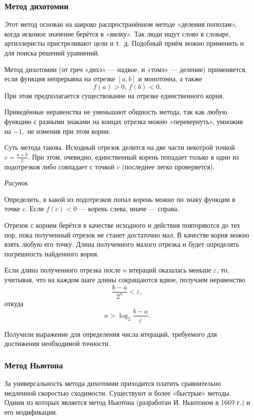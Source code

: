 \subsubsection{Метод дихотомии}

Этот метод основан на широко распространённом методе «деления пополам»,
когда искомое значение берётся в »вилку». Так люди ищут слово в словаре,
артиллеристы пристреливают цели и т.~д. Подобный приём можно применить
и для поиска решений уравнений.

Метод дихотомии (от греч «дихэ» — надвое, и «томэ» — деление) применяется,
если функция непрерывна на отрезке $[a,b]$ и монотонна, а также 
\[
f(a)>0,\, f(b)<0.
\]
При этом предполагается существование на отрезке единственного корня.

Приведённые неравенства не уменьшают общность метода, так как любую
функцию с разными знаками на концах отрезка можно «перевернуть», умножив
на $-1,$ не изменив при этом корни.

Суть метода такова. Исходный отрезок делится на две части некотрой
точкой $c=\frac{a+b}{2}$. При этом, очевидно, единственный корень
попадает только в один из подотрезков либо совпадает с точкой $c$
(последнее легко проверяется).

\emph{Рисунок}

Определить, в какой из подотрезков попал корень можно по знаку функции
в точке $c$. Если $f(c)<0$ — корень слева, иначе — справа.

Отрезок с корнем берётся в качестве исходного и действия повторяются
до тех пор, пока полученный отрезок не станет достаточно мал. В качестве
корня можно взять любую его точку. Длина полученного малого отрезка
и будет определять погрешность найденного корня.

Если длина полученного отрезка после $n$ итераций оказалась меньше
$\varepsilon$, то, учитывая, что на каждом шаге длины сокращаются
вдвое, получаем неравенство
\[
\frac{b-a}{2^{n}}<\varepsilon,
\]
откуда
\[
n>\log_{2}\frac{b-a}{\varepsilon}.
\]


Получили выражение для определения числа итераций, требуемого для
достижения необходимой точности.


\subsubsection{Метод Ньютона}

За универсальность метода дихотомии приходится платить сравнительно
медленной скоростью сходимости. Существуют и более «быстрые» методы.
Одним из которых является метод Ньютона (разработан И. Ньютоном в
1669 г.) и его модификации.

